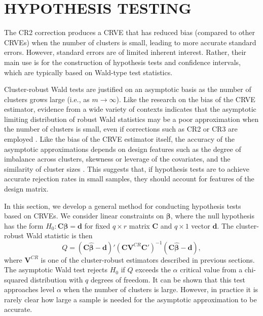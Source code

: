 \documentclass[12pt]{article}\usepackage[]{graphicx}\usepackage[]{color}
\newcommand{\bm}{\mathbf}
\newcommand{\bs}{\boldsymbol}
\begin{document}
\section{HYPOTHESIS TESTING}
\label{sec:testing}

The CR2 correction produces a CRVE that has reduced bias (compared to other CRVEs) when the number of clusters is small, leading to more accurate standard errors. However, standard errors are of limited inherent interest. Rather, their main use is for the construction of hypothesis tests and confidence intervals, which are typically based on Wald-type test statistics.

Cluster-robust Wald tests are justified on an asymptotic basis as the number of clusters grows large (i.e., as $m \to \infty$). 
Like the research on the bias of the CRVE estimator, evidence from a wide variety of contexts indicates that the asymptotic limiting distribution of robust Wald statistics may be a poor approximation when the number of clusters is small, even if corrections such as CR2 or CR3 are employed \citep{Bell2002bias, Bertrand2004how, Cameron2008bootstrap}. 
Like the bias of the CRVE estimator itself, the accuracy of the asymptotic approximations depends on design features such as the degree of imbalance across clusters, skewness or leverage of the covariates, and the similarity of cluster sizes \citep[][]{McCaffrey2001generalizations, MacKinnon2016wild, Carter2013asymptotic}. 
This suggests that, if hypothesis tests are to achieve accurate rejection rates in small samples, they should account for features of the design matrix.

In this section, we develop a general method for conducting hypothesis tests based on CRVEs. We consider linear constraints on $\bs\beta$, where the null hypothesis has the form $H_0: \bm{C}\bs\beta = \bm{d}$ for fixed $q \times r$ matrix $\bm{C}$ and $q \times 1$ vector $\bm{d}$. 
The cluster-robust Wald statistic is then
\begin{equation}
\label{eq:Wald_stat}
Q = \left(\bm{C}\bs{\hat\beta} - \bm{d}\right)'\left(\bm{C} \bm{V}^{CR} \bm{C}'\right)^{-1}\left(\bm{C}\bs{\hat\beta} - \bm{d}\right),
\end{equation}
where $\bm{V}^{CR}$ is one of the cluster-robust estimators described in previous sections. 
The asymptotic Wald test rejects $H_0$ if $Q$ exceeds the $\alpha$ critical value from a chi-squared distribution with $q$ degrees of freedom. 
It can be shown that this test approaches level $\alpha$ when the number of clusters is large. 
However, in practice it is rarely clear how large a sample is needed for the asymptotic approximation to be accurate. 
\end{document}
